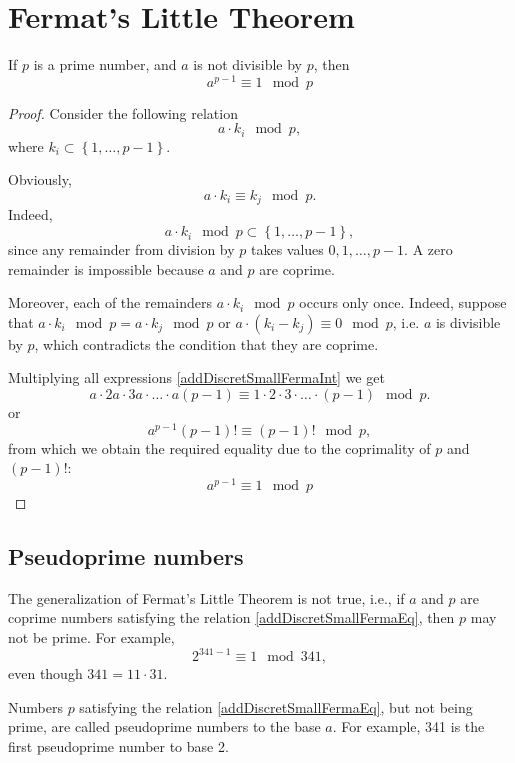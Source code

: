 \section{Fermat's Little Theorem}

\begin{theorem}
\label{addDiscretSmallFerma}
If $p$ is a prime number, and $a$ is not divisible by $p$, then 
\begin{equation}
a^{p-1} \equiv 1 \mod{p}
\label{addDiscretSmallFermaEq}
\end{equation}
\end{theorem}

\begin{proof}
Consider the following relation
\[
a \cdot k_i \mod{p},
\]
where $k_i \subset \left\{1, \dots, p - 1\right\}$.

Obviously, 
\begin{equation}
a \cdot k_i \equiv k_j \mod{p}.
\label{addDiscretSmallFermaInt}
\end{equation}
Indeed,
\[
a \cdot k_i \mod{p} \subset \left\{1, \dots, p - 1\right\},
\]
since any remainder from division by $p$ takes values $0, 1, \dots,
p-1$. A zero remainder is impossible because $a$ and $p$ are coprime.

Moreover, each of the remainders $a \cdot k_i \mod{p}$ occurs
only once. Indeed, suppose that $a \cdot k_i \mod{p} = a
\cdot k_j \mod{p}$ or $a \cdot \left( k_i - k_j \right ) \equiv 0
\mod{p}$, i.e. $a$ is divisible by $p$, which contradicts the condition that they are coprime. 

Multiplying all expressions \autoref{addDiscretSmallFermaInt} we get
\[
a \cdot 2a \cdot 3a \cdot \dots \cdot a\left(p - 1\right) 
\equiv 1 \cdot 2 \cdot 3 \cdot \dots \cdot \left(p - 1\right) \mod{p}.
\]
or
\[
a^{p-1} \left(p - 1\right)! \equiv \left(p - 1\right)! \mod{p},
\]
from which we obtain the required equality due to the coprimality of $p$ and
$\left(p-1\right)!$:
\[
a^{p-1} \equiv 1 \mod{p}
\]
\end{proof}

\subsection{Pseudoprime numbers}
The generalization of Fermat's Little Theorem is not true, i.e., if $a$ and $p$ are coprime numbers satisfying the relation
\autoref{addDiscretSmallFermaEq}, then $p$ may not be prime. For example,
\[
2 ^ {341 - 1} \equiv 1 \mod{ 341 },
\] 
even though $341 = 11 \cdot 31$.

Numbers $p$ satisfying the relation \autoref{addDiscretSmallFermaEq},
but not being prime, are called pseudoprime numbers to the base $a$. For example, 341 is the first pseudoprime number to base 2.
